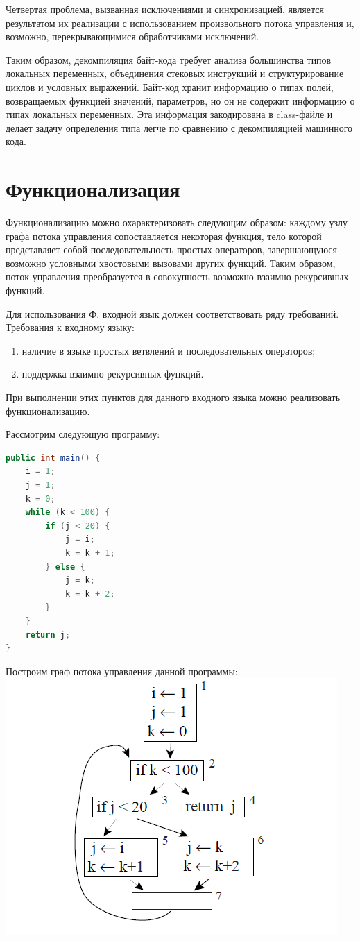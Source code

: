 Четвертая проблема, вызванная исключениями и синхронизацией, является результатом их реализации с использованием произвольного потока управления и, возможно, перекрывающимися обработчиками исключений.

Таким образом, декомпиляция байт-кода требует анализа большинства типов локальных переменных, объединения стековых инструкций  и структурирование циклов и условных выражений. Байт-код хранит информацию о типах полей, возвращаемых функцией значений, параметров, но он не содержит информацию о типах локальных переменных. Эта информация закодирована в class-файле и делает задачу определения типа легче по сравнению с декомпиляцией машинного кода.

\section{Функционализация}

Функционализацию\cite{ssa} можно охарактеризовать следующим образом: каждому узлу графа потока управления сопоставляется некоторая функция, тело которой представляет собой последовательность простых операторов, завершающуюся возможно условными хвостовыми вызовами других функций. Таким образом, поток управления преобразуется в совокупность возможно взаимно рекурсивных функций. 

Для использования Ф. входной язык должен соответствовать ряду требований.
Требования к входному языку:
\begin{enumerate}
\item наличие в языке простых ветвлений и последовательных операторов;
\item поддержка взаимно рекурсивных функций.
\end{enumerate}

При выполнении этих пунктов для данного входного языка можно реализовать функционализацию. 

Рассмотрим следующую программу:

\begin{lstlisting}[frame = single, language = Java]
public int main() {
	i = 1;
	j = 1;
	k = 0;
	while (k < 100) {
		if (j < 20) {
			j = i;
			k = k + 1;
		} else {
			j = k;
			k = k + 2;
		}
	}
	return j;
}
\end{lstlisting}
\vspace{0.2cm}
Построим граф потока управления данной программы: \\
\includegraphics[width=0.7\linewidth]{Zabransky/cfgappel.png}


